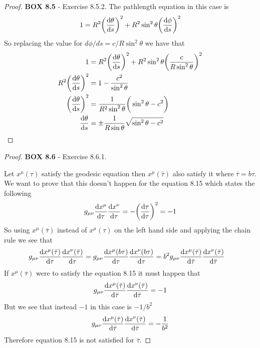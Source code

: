 \documentclass[11pt]{article}
\theoremstyle{definition}
\begin{document}
\cleardoublepage
\begin{proof}{\textbf{BOX 8.5} - Exercise 8.5.2.}
    The pathlength equation in this case is
    \begin{align*}
        1 = R^2\bigg(\derivative{\theta}{s}\bigg)^2
        + R^2\sin^2\theta\bigg(\derivative{\phi}{s}\bigg)^2
    \end{align*}
    So replacing the value for $d\phi/ds = c/R\sin^2\theta$ we have that
    \begin{align*}
        1 &= R^2\bigg(\derivative{\theta}{s}\bigg)^2
        + R^2\sin^2\theta\bigg(\frac{c}{R\sin^2\theta}\bigg)^2\\
        R^2\bigg(\derivative{\theta}{s}\bigg)^2 &= 
        1 - \frac{c^2}{\sin^2\theta}\\
        \bigg(\derivative{\theta}{s}\bigg)^2 &= 
        \frac{1}{R^2\sin^2\theta}\bigg(\sin^2\theta - c^2\bigg)\\
        \derivative{\theta}{s} &= 
        \pm\frac{1}{R\sin\theta}\sqrt{\sin^2\theta - c^2}
    \end{align*}
\end{proof}
\cleardoublepage
\begin{proof}{\textbf{BOX 8.6} - Exercise 8.6.1.}

    Let $x^\mu(\tau)$ satisfy the geodesic equation then $x^\mu(\bar{\tau})$
    also satisfy it where $\bar{\tau} = b\tau$.
    We want to prove that this doesn't happen for the equation 8.15 which
    states the following 
    \begin{align*}
        g_{\mu\nu}\derivative{x^\mu}{\tau}\derivative{x^\nu}{\tau}
        = -\bigg(\derivative{\tau}{\tau}\bigg)^2 = -1
    \end{align*}
    So using $x^\mu(\bar{\tau})$ instead of $x^\mu(\tau)$ on the left hand side
    and applying the chain rule we see that
    \begin{align*}
        g_{\mu\nu}\derivative{x^\mu(\bar\tau)}{\tau}
        \derivative{x^\nu(\bar\tau)}{\tau}
        &= g_{\mu\nu}\derivative{x^\mu(b\tau)}{\tau}
        \derivative{x^\nu(b\tau)}{\tau}
        = b^2g_{\mu\nu}\derivative{x^\mu(\bar\tau)}{\bar\tau}
        \derivative{x^\nu(\bar\tau)}{\bar\tau}
    \end{align*}
    If $x^\mu(\bar\tau)$ were to satisfy the equation 8.15 it must happen that
    \begin{align*}
        g_{\mu\nu}\derivative{x^\mu(\bar\tau)}{\bar\tau}
        \derivative{x^\nu(\bar\tau)}{\bar\tau} = -1
    \end{align*}
    But we see that instead $-1$ in this case is $-1/b^2$ 
    \begin{align*}
        g_{\mu\nu}\derivative{x^\mu(\bar\tau)}{\bar\tau}
        \derivative{x^\nu(\bar\tau)}{\bar\tau} = -\frac{1}{b^2}
    \end{align*}
    Therefore equation 8.15 is not satisfied for $\bar\tau$.
\end{proof}
\end{document}
